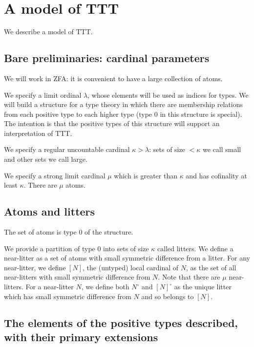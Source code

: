 \documentclass[12pt]{article}
\begin{document}
\newpage

\section{A model of TTT}

We describe a model of TTT. 

\subsection{Bare preliminaries:  cardinal parameters}

We will work in ZFA:  it is convenient to have a large collection of atoms.

We specify a limit ordinal $\lambda$, whose elements will be used as indices for types.  We will build a structure for a type theory in which there are membership relations from each positive type to each higher type (type 0 in this structure is special).  The intention is that the positive types of this structure will support an interpretation of TTT.

We specify a regular uncountable cardinal $\kappa>\lambda$:  sets of size $<\kappa$ we call small and other sets we call large.

We specify a strong limit cardinal $\mu$ which is greater than $\kappa$ and has cofinality at least $\kappa$.  There are $\mu$ atoms.

\subsection{Atoms and litters}

The set of atoms is type 0 of the structure.

We provide a partition of type 0 into sets of size $\kappa$ called litters.  We define a near-litter as a set of atoms with small symmetric difference from a litter.  For any near-litter, we define $[N]$, the (untyped) local cardinal of $N$, as the set of all near-litters with small symmetric difference from $N$.  Note that there are $\mu$ near-litters.  For a near-litter $N$, we define both $N^\circ$ and $[N]^\circ$ as the unique litter which has small symmetric difference from $N$ and so belongs to $[N]$.

\subsection{The elements of the positive types described, with their primary extensions}
\end{document}
